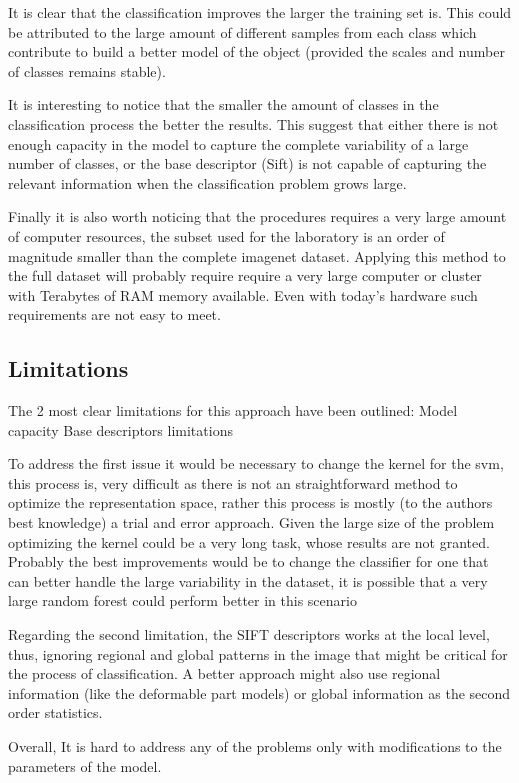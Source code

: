 \documentclass[10pt,twocolumn,letterpaper]{article}
\begin{document}
It is clear that the classification improves the larger the training set is. This could be attributed to the large amount of different samples from each class which contribute to build a better model of the object (provided the scales and number of classes remains stable).

It is interesting to notice that the smaller the amount of classes in the classification process the better the results. This suggest that either there is not enough capacity in the model to capture the complete variability of a large number of classes, or the base descriptor (Sift) is not capable of capturing the relevant information when the classification problem grows large.

Finally it is also worth noticing that the procedures requires a very large amount of computer resources, the subset used for the laboratory is an order of magnitude smaller than the complete imagenet dataset. Applying this method to the full dataset will probably require require a very large computer or cluster with Terabytes of RAM memory available. Even with today's hardware such requirements are not easy to meet.

\subsection{Limitations}

The 2 most clear limitations  for this approach have been outlined: Model capacity Base descriptors limitations


To address the first issue it would be necessary to change the kernel for the svm, this process is, very difficult as there is not an straightforward method to optimize the representation space, rather this process is mostly (to the authors best knowledge) a trial and error approach. Given the large size of the problem optimizing the kernel  could be a very long task, whose results are not granted. Probably the best improvements would be to change the classifier for one that can better handle the large variability in the dataset, it is possible that a very large random forest could perform better in this scenario


Regarding the second limitation, the SIFT descriptors works at the local level, thus, ignoring regional and global patterns in the image that might be critical for the process of classification. A better approach might also use regional information (like the deformable part models) or global information as the second order statistics.

Overall, It is hard to address any of the problems only with modifications to the parameters of the model. 


{\small


}
\end{document}
